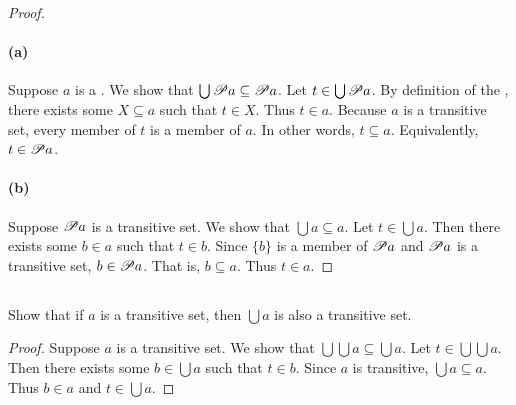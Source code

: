 \documentclass{report}
\begin{document}
  \begin{proof}

    \paragraph{(a)}%

      Suppose $a$ is a .
      We show that $\bigcup \mathscr{P}a \subseteq \mathscr{P}a$.
      Let $t \in \bigcup \mathscr{P}a$.
      By definition of the , there exists some
        $X \subseteq a$ such that $t \in X$.
      Thus $t \in a$.
      Because $a$ is a transitive set, every member of $t$ is a member of $a$.
      In other words, $t \subseteq a$.
      Equivalently, $t \in \mathscr{P}a$.

    \paragraph{(b)}%

      Suppose $\mathscr{P}a$ is a transitive set.
      We show that $\bigcup a \subseteq a$.
      Let $t \in \bigcup a$.
      Then there exists some $b \in a$ such that $t \in b$.
      Since $\{b\}$ is a member of $\mathscr{P}a$ and $\mathscr{P}a$ is a
        transitive set, $b \in \mathscr{P}a$.
      That is, $b \subseteq a$.
      Thus $t \in a$.

  \end{proof}

\subsection{}%

  Show that if $a$ is a transitive set, then $\bigcup a$ is also a transitive set.

  \begin{proof}
    Suppose $a$ is a transitive set.
    We show that $\bigcup\bigcup{a} \subseteq \bigcup a$.
    Let $t \in \bigcup\bigcup{a}$.
    Then there exists some $b \in \bigcup{a}$ such that $t \in b$.
    Since $a$ is transitive, $\bigcup{a} \subseteq a$.
    Thus $b \in a$ and $t \in \bigcup a$.
  \end{proof}

\subsection{}%
\end{document}
